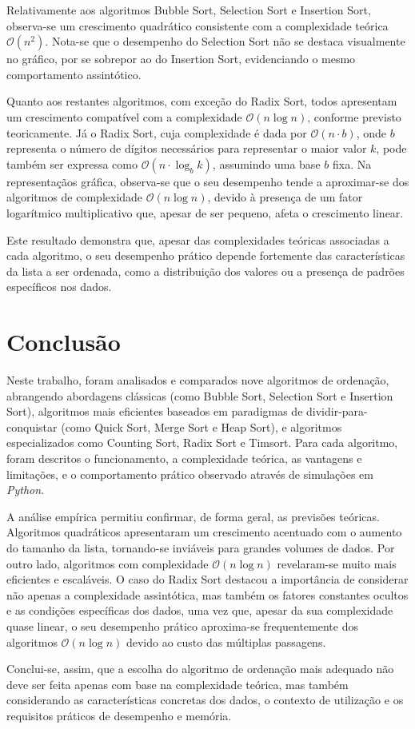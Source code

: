 \documentclass[conference]{IEEEtran}
\begin{document}
Relativamente aos algoritmos Bubble Sort, Selection Sort e Insertion Sort, observa-se um crescimento quadrático consistente com a complexidade teórica \( \mathcal{O}(n^2) \). Nota-se que o desempenho do Selection Sort não se destaca visualmente no gráfico, por se sobrepor ao do Insertion Sort, evidenciando o mesmo comportamento assintótico.

Quanto aos restantes algoritmos, com exceção do Radix Sort, todos apresentam um crescimento compatível com a complexidade \( \mathcal{O}(n \log n) \), conforme previsto teoricamente. Já o Radix Sort, cuja complexidade é dada por \( \mathcal{O}(n \cdot b) \), onde \( b \) representa o número de dígitos necessários para representar o maior valor \( k \), pode também ser expressa como \( \mathcal{O}(n \cdot \log_b k) \), assumindo uma base \( b \) fixa. Na representaçãos gráfica, observa-se que o seu desempenho tende a aproximar-se dos algoritmos de complexidade \( \mathcal{O}(n \log n) \), devido à presença de um fator logarítmico multiplicativo que, apesar de ser pequeno, afeta o crescimento linear.

Este resultado demonstra que, apesar das complexidades teóricas associadas a cada algoritmo, o seu desempenho prático depende fortemente das características da lista a ser ordenada, como a distribuição dos valores ou a presença de padrões específicos nos dados.

\section{Conclusão}

Neste trabalho, foram analisados e comparados nove algoritmos de ordenação, abrangendo abordagens clássicas (como Bubble Sort, Selection Sort e Insertion Sort), algoritmos mais eficientes baseados em paradigmas de dividir-para-conquistar (como Quick Sort, Merge Sort e Heap Sort), e algoritmos especializados como Counting Sort, Radix Sort e Timsort. Para cada algoritmo, foram descritos o funcionamento, a complexidade teórica, as vantagens e limitações, e o comportamento prático observado através de simulações em \textit{Python}.

A análise empírica permitiu confirmar, de forma geral, as previsões teóricas. Algoritmos quadráticos apresentaram um crescimento acentuado com o aumento do tamanho da lista, tornando-se inviáveis para grandes volumes de dados. Por outro lado, algoritmos com complexidade \( \mathcal{O}(n \log n) \) revelaram-se muito mais eficientes e escaláveis. O caso do Radix Sort destacou a importância de considerar não apenas a complexidade assintótica, mas também os fatores constantes ocultos e as condições específicas dos dados, uma vez que, apesar da sua complexidade quase linear, o seu desempenho prático aproxima-se frequentemente dos algoritmos \( \mathcal{O}(n \log n) \) devido ao custo das múltiplas passagens.

Conclui-se, assim, que a escolha do algoritmo de ordenação mais adequado não deve ser feita apenas com base na complexidade teórica, mas também considerando as características concretas dos dados, o contexto de utilização e os requisitos práticos de desempenho e memória.



\end{document}
